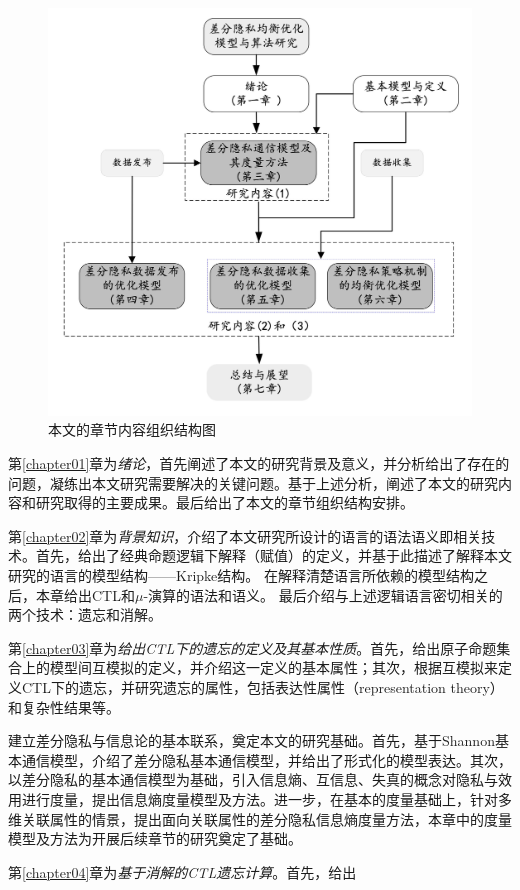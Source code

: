 \begin{figure}[htbp]
	\centering
	\includegraphics[width = 0.7\linewidth]{./figures/chapter01_2.jpg}
	\caption{本文的章节内容组织结构图}
	\label{fig:chapter1-research-structure}
\end{figure}

第\ref{chapter01}章为\textit{绪论}，首先阐述了本文的研究背景及意义，并分析给出了存在的问题，凝练出本文研究需要解决的关键问题。基于上述分析，阐述了本文的研究内容和研究取得的主要成果。最后给出了本文的章节组织结构安排。


第\ref{chapter02}章为{\em 背景知识}，介绍了本文研究所设计的语言的语法语义即相关技术。首先，给出了经典命题逻辑下解释（赋值）的定义，并基于此描述了解释本文研究的语言的模型结构——Kripke结构。
在解释清楚语言所依赖的模型结构之后，本章给出CTL和$\mu$-演算的语法和语义。
最后介绍与上述逻辑语言密切相关的两个技术：遗忘和消解。



第\ref{chapter03}章为{\em 给出CTL下的遗忘的定义及其基本性质}。首先，给出原子命题集合上的模型间互模拟的定义，并介绍这一定义的基本属性；其次，根据互模拟来定义CTL下的遗忘，并研究遗忘的属性，包括表达性属性（representation theory）和复杂性结果等。

建立差分隐私与信息论的基本联系，奠定本文的研究基础。首先，基于Shannon基本通信模型，介绍了差分隐私基本通信模型，并给出了形式化的模型表达。其次，以差分隐私的基本通信模型为基础，引入信息熵、互信息、失真的概念对隐私与效用进行度量，提出信息熵度量模型及方法。进一步，在基本的度量基础上，针对多维关联属性的情景，提出面向关联属性的差分隐私信息熵度量方法，本章中的度量模型及方法为开展后续章节的研究奠定了基础。

第\ref{chapter04}章为{\em 基于消解的CTL遗忘计算}。首先，给出

